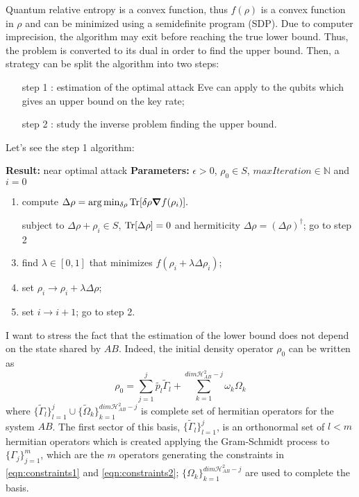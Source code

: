 \documentclass{article}
\begin{document}
    Quantum relative entropy is a convex function, thus \(f(\rho)\) is a convex function in \(\rho\) and can be minimized using a semidefinite program (SDP).
    Due to computer imprecision, the algorithm may exit before reaching the true lower bound.
    Thus, the problem is converted to its dual in order to find the upper bound.
    Then, a strategy can be split the algorithm into two steps:
    \begin{enumerate}
        \item[step 1]: estimation of the optimal attack Eve can apply to the qubits which gives an upper bound on the key rate;
        \item[step 2]: study the inverse problem finding the upper bound.
    \end{enumerate}
    Let's see the step 1 algorithm:
    \begin{algorithm}
        \caption{}
        \begin{algorithmic}[1]
        \Statex \textbf{Result:} near optimal attack
        \Statex \textbf{Parameters:} \(\epsilon > 0\), \(\rho_0\in S\), \(maxIteration\in\mathbb{N}\) and \(i=0\)
        \begin{enumerate}
            \item compute \(\Delta\rho = \arg\min_{\delta\rho}\Tr[ \delta\rho \grad f(\rho_i) ].\)
            \item[] subject to \(\Delta\rho + \rho_i \in S\), \(\Tr[\Delta\rho]=0\) and hermiticity \(\Delta\rho=(\Delta\rho)^{\dagger}\);
             go to step 2\EndIf
            \item find \(\lambda\in[0,1]\) that minimizes \(f(\rho_i+\lambda\Delta\rho_i)\);
            \item set $\rho_i \to \rho_i + \lambda \Delta\rho$;
            \item set $i \to i + 1$;
             go to step 2\EndIf.
        \end{enumerate}
        \end{algorithmic}
    \end{algorithm}

    I want to stress the fact that the estimation of the lower bound does not depend on the state shared by \(AB\).
    Indeed, the initial density operator \(\rho_0\) can be written as
    \[\rho_0 = \sum_{j=1}^j\tilde{p_l}\tilde{\Gamma}_l + \sum_{k=1}^{dim \mathcal{H}_{AB}^2-j}\omega_k\Omega_k\]
    where \(\{\tilde{\Gamma}_l\}_{l=1}^j\cup \{\tilde{\Omega}_k\}_{k=1}^{dim \mathcal{H}_{AB}^2-j}\)
    is complete set of hermitian operators for the system \(AB\).
    The first sector of this basis, \(\{\tilde{\Gamma}_l\}_{l=1}^j\), is an orthonormal set of \(l<m\) hermitian operators which is created applying the Gram-Schmidt process to \(\{\Gamma_j\}_{j=1}^{m}\), which are the \(m\) operators generating the constraints in \eqref{eqn:constraints1} and \eqref{eqn:constraints2};
    \(\{\Omega_k\}_{k=1}^{dim \mathcal{H}_{AB}^2-j}\) are used to complete the basis.
\end{document}
